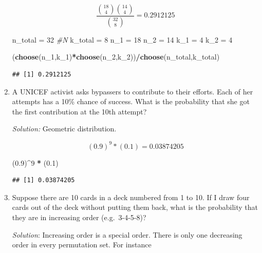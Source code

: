 \documentclass[]{book}
\newenvironment{Shaded}{\begin{snugshade}}{\end{snugshade}}
\newcommand{\CommentTok}[1]{\textcolor[rgb]{0.56,0.35,0.01}{\textit{#1}}}
\newcommand{\DecValTok}[1]{\textcolor[rgb]{0.00,0.00,0.81}{#1}}
\newcommand{\FloatTok}[1]{\textcolor[rgb]{0.00,0.00,0.81}{#1}}
\newcommand{\KeywordTok}[1]{\textcolor[rgb]{0.13,0.29,0.53}{\textbf{#1}}}
\newcommand{\NormalTok}[1]{#1}
\newcommand{\OperatorTok}[1]{\textcolor[rgb]{0.81,0.36,0.00}{\textbf{#1}}}
\newcommand{\StringTok}[1]{\textcolor[rgb]{0.31,0.60,0.02}{#1}}
\theoremstyle{definition}
\theoremstyle{definition}
\theoremstyle{definition}
\theoremstyle{remark}
\begin{document}
\begin{enumerate}
  \[\dfrac{\binom{18}{4}\binom{14}{4}}{\binom{32}{8}} = 0.2912125\]

\begin{Shaded}
\begin{Highlighting}[]
\NormalTok{n_total =}\StringTok{ }\DecValTok{32} \CommentTok{#N}
\NormalTok{k_total =}\StringTok{ }\DecValTok{8}
\NormalTok{n_}\DecValTok{1}\NormalTok{ =}\StringTok{ }\DecValTok{18}
\NormalTok{n_}\DecValTok{2}\NormalTok{ =}\StringTok{ }\DecValTok{14}
\NormalTok{k_}\DecValTok{1}\NormalTok{ =}\StringTok{ }\DecValTok{4}
\NormalTok{k_}\DecValTok{2}\NormalTok{ =}\StringTok{ }\DecValTok{4}

\NormalTok{(}\KeywordTok{choose}\NormalTok{(n_}\DecValTok{1}\NormalTok{,k_}\DecValTok{1}\NormalTok{)}\OperatorTok{*}\KeywordTok{choose}\NormalTok{(n_}\DecValTok{2}\NormalTok{,k_}\DecValTok{2}\NormalTok{))}\OperatorTok{/}\KeywordTok{choose}\NormalTok{(n_total,k_total)}
\end{Highlighting}
\end{Shaded}

\begin{verbatim}
## [1] 0.2912125
\end{verbatim}
\item
  A UNICEF activist asks bypassers to contribute to their efforts. Each
  of her attempts has a 10\% chance of success. What is the probability
  that she got the first contribution at the 10th attempt?

  \emph{Solution:} Geometric distribution.

  \[ (0.9)^9 * (0.1) = 0.03874205\]

\begin{Shaded}
\begin{Highlighting}[]
\NormalTok{(}\FloatTok{0.9}\NormalTok{)}\OperatorTok{^}\DecValTok{9} \OperatorTok{*}\StringTok{ }\NormalTok{(}\FloatTok{0.1}\NormalTok{)}
\end{Highlighting}
\end{Shaded}

\begin{verbatim}
## [1] 0.03874205
\end{verbatim}
\item
  Suppose there are 10 cards in a deck numbered from 1 to 10. If I draw
  four cards out of the deck without putting them back, what is the
  probability that they are in increasing order (e.g.~3-4-5-8)?

  \emph{Solution}: Increasing order is a special order. There is only
  one decreasing order in every permutation set. For instance


\end{enumerate}
\end{document}
